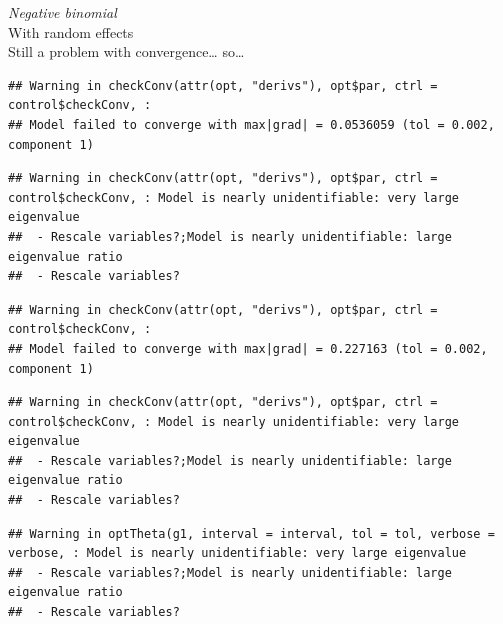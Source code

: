 \documentclass[
]{article}
\begin{document}
\emph{Negative binomial}\\
With random effects\\
Still a problem with convergence\ldots{} so\ldots{}\\

\begin{verbatim}
## Warning in checkConv(attr(opt, "derivs"), opt$par, ctrl = control$checkConv, :
## Model failed to converge with max|grad| = 0.0536059 (tol = 0.002, component 1)
\end{verbatim}

\begin{verbatim}
## Warning in checkConv(attr(opt, "derivs"), opt$par, ctrl = control$checkConv, : Model is nearly unidentifiable: very large eigenvalue
##  - Rescale variables?;Model is nearly unidentifiable: large eigenvalue ratio
##  - Rescale variables?
\end{verbatim}

\begin{verbatim}
## Warning in checkConv(attr(opt, "derivs"), opt$par, ctrl = control$checkConv, :
## Model failed to converge with max|grad| = 0.227163 (tol = 0.002, component 1)
\end{verbatim}

\begin{verbatim}
## Warning in checkConv(attr(opt, "derivs"), opt$par, ctrl = control$checkConv, : Model is nearly unidentifiable: very large eigenvalue
##  - Rescale variables?;Model is nearly unidentifiable: large eigenvalue ratio
##  - Rescale variables?
\end{verbatim}

\begin{verbatim}
## Warning in optTheta(g1, interval = interval, tol = tol, verbose = verbose, : Model is nearly unidentifiable: very large eigenvalue
##  - Rescale variables?;Model is nearly unidentifiable: large eigenvalue ratio
##  - Rescale variables?
\end{verbatim}
\end{document}
